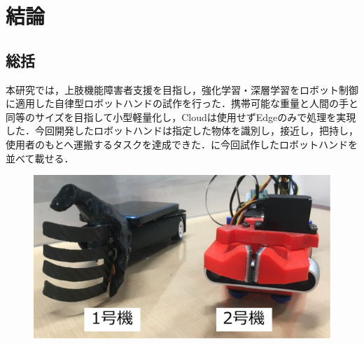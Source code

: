 \chapter{結論}
\newpage

\section{総括}
本研究では，上肢機能障害者支援を目指し，強化学習・深層学習をロボット制御に適用した自律型ロボットハンドの試作を行った．携帯可能な重量と人間の手と同等のサイズを目指して小型軽量化し，Cloudは使用せずEdgeのみで処理を実現した．今回開発したロボットハンドは指定した物体を識別し，接近し，把持し，使用者のもとへ運搬するタスクを達成できた．に今回試作したロボットハンドを並べて載せる．
\begin{figure}[H]
    \centering
    \begin{minipage}{0.65\hsize}
        \centering
        \includegraphics[width=\linewidth]{figure/chapter5/ロボットハンドまとめ前}
    \end{minipage}
    \hspace*{\fill}
    \begin{minipage}{0.32\hsize}
        \centering

\end{minipage}
\end{figure}
